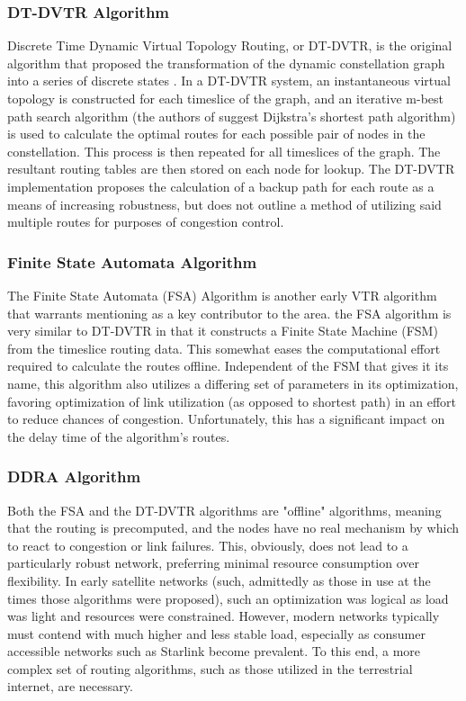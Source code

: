 \subsubsection{DT-DVTR Algorithm}\label{subsubsec:dt-dvtr}
Discrete Time Dynamic Virtual Topology Routing, or DT-DVTR, is the original algorithm that proposed the transformation of the dynamic constellation graph into a series of discrete states \cite{werner_dynamic_1997}. In a DT-DVTR system, an instantaneous virtual topology is constructed for each timeslice of the graph, and an iterative m-best path search algorithm (the authors of \cite{werner_dynamic_1997} suggest Dijkstra's shortest path algorithm) is used to calculate the optimal routes for each possible pair of nodes in the constellation. This process is then repeated for all timeslices of the graph. The resultant routing tables are then stored on each node for lookup. The DT-DVTR implementation proposes the calculation of a backup path for each route as a means of increasing robustness, but does not outline a method of utilizing said multiple routes for purposes of congestion control.

\subsubsection{Finite State Automata Algorithm}\label{subsubsec:fsa}
The Finite State Automata (FSA) Algorithm is another early VTR algorithm that warrants mentioning as a key contributor to the area. the FSA algorithm is very similar to DT-DVTR in that it constructs a Finite State Machine (FSM) from the timeslice routing data. This somewhat eases the computational effort required to calculate the routes offline. Independent of the FSM that gives it its name, this algorithm also utilizes a differing set of parameters in its optimization, favoring optimization of link utilization (as opposed to shortest path) in an effort to reduce chances of congestion. Unfortunately, this has a significant impact on the delay time of the algorithm's routes.

\subsubsection {DDRA Algorithm}\label{subsubsec:ddra}
Both the FSA and the DT-DVTR algorithms are "offline" algorithms, meaning that the routing is precomputed, and the nodes have no real mechanism by which to react to congestion or link failures. This, obviously, does not lead to a particularly robust network, preferring minimal resource consumption over flexibility. In early satellite networks (such, admittedly as those in use at the times those algorithms were proposed), such an optimization was logical as load was light and resources were constrained. However, modern networks typically must contend with much higher and less stable load, especially as consumer accessible networks such as Starlink become prevalent. To this end, a more complex set of routing algorithms, such as those utilized in the terrestrial internet, are necessary.

